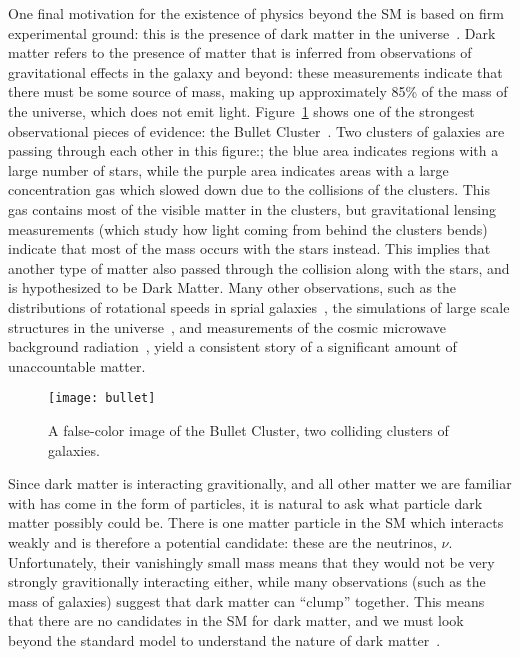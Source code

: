 One final motivation for the existence of physics beyond the SM is based on firm experimental ground: this is the presence of dark matter in the universe~\cite{Jungman}. Dark matter refers to the presence of matter that is inferred from observations of gravitational effects in the galaxy and beyond: these measurements indicate that there must be some source of mass, making up approximately 85\% of the mass of the universe, which does not emit light. Figure~\ref{fig:susy:bullet} shows one of the strongest observational pieces of evidence: the Bullet Cluster~\cite{Tucker:1998tp,Markevitch:2003at}. Two clusters of galaxies are passing through each other in this figure:; the blue area indicates regions with a large number of stars, while the purple area indicates areas with a large concentration gas which slowed down due to the collisions of the clusters. This gas contains most of the visible matter in the clusters, but gravitational lensing measurements (which study how light coming from behind the clusters bends) indicate that most of the mass occurs with the stars instead. This implies that another type of matter also passed through the collision along with the stars, and is hypothesized to be Dark Matter. Many other observations, such as the distributions of rotational speeds in sprial galaxies~\cite{Rubin}, the simulations of large scale structures in the universe~\cite{Springel:2005nw}, and measurements of the cosmic microwave background radiation~\cite{Ade:2015xua}, yield a consistent story of a significant amount of unaccountable matter.



\begin{figure}
\centering
\texttt{[image: bullet]}
\caption{A false-color image of the Bullet Cluster, two colliding clusters of galaxies.}
\label{fig:susy:bullet}
\end{figure}


Since dark matter is interacting gravitionally, and all other matter we are familiar with has come in the form of particles, it is natural to ask what particle dark matter possibly could be. There is one matter particle in the SM which interacts weakly and is therefore a potential candidate: these are the neutrinos, $\nu$. Unfortunately, their vanishingly small mass means that they would not be very strongly gravitionally interacting either, while many observations (such as the mass of galaxies) suggest that dark matter can ``clump'' together. This means that there are no candidates in the SM for dark matter, and we must look beyond the standard model to understand the nature of dark matter~\cite{Jungman}.


